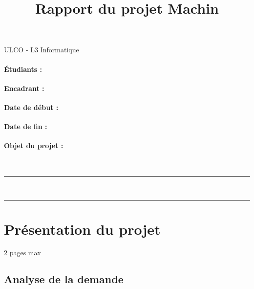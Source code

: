 \documentclass[a4paper,oneside]{article}
\title{Rapport du projet Machin}
\author{}
\date{}
\begin{document}

\thispagestyle{empty}

\Large
ULCO - L3 Informatique

\vfill 

\Huge
\begin{center}
\@title
\end{center}

\normalsize

\vfill 

\paragraph{Étudiants : }

\paragraph{Encadrant : }

\paragraph{Date de début : }

\paragraph{Date de fin : }

\paragraph{Objet du projet : }

~

\vfill 

\noindent\rule{\linewidth}{0.5pt}

\tableofcontents

~\\
\noindent\rule{\linewidth}{0.5pt}

\clearpage


\section{Présentation du projet}

2 pages max 

\subsection{Analyse de la demande}
\end{document}
